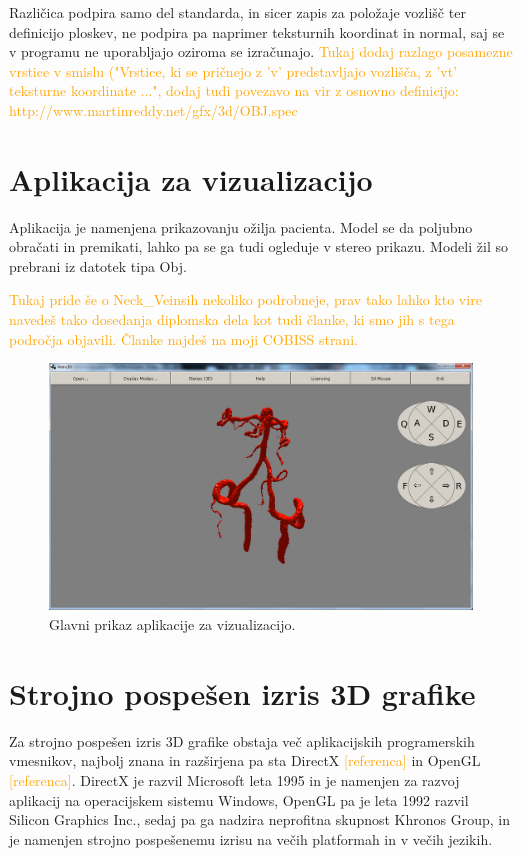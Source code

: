 \documentclass[a4paper, 12pt]{book}
\begin{document}
Različica podpira samo del standarda, in sicer zapis za položaje vozlišč ter definicijo ploskev, ne podpira pa naprimer teksturnih koordinat in normal, saj se v programu ne uporabljajo oziroma se izračunajo.
\textcolor{orange}{Tukaj dodaj razlago posamezne vrstice v smislu ("Vrstice, ki se pričnejo z 'v' predstavljajo vozlišča, z 'vt' teksturne koordinate ...", dodaj tudi povezavo na vir z osnovno definicijo: http://www.martinreddy.net/gfx/3d/OBJ.spec}

\section{Aplikacija za vizualizacijo}

Aplikacija je namenjena prikazovanju ožilja pacienta. Model se da poljubno obračati in premikati, lahko pa se ga tudi ogleduje v stereo prikazu. Modeli žil so prebrani iz datotek tipa Obj. 

\textcolor{orange}{Tukaj pride še o Neck\_Veinsih nekoliko podrobneje, prav tako lahko kto vire navedeš tako dosedanja diplomska dela kot tudi članke, ki smo jih s tega področja objavili. Članke najdeš na moji COBISS strani.}
\begin{figure}
\begin{center}
\includegraphics[width=14cm]{Aplikacija.png}
\end{center}
\caption{Glavni prikaz aplikacije za vizualizacijo.}
\label{aplikacija}
\end{figure}

\section{Strojno pospešen izris 3D grafike}
Za strojno pospešen izris 3D grafike obstaja več aplikacijskih programerskih vmesnikov, najbolj znana in razširjena pa sta DirectX \textcolor{orange}{[referenca]} in OpenGL  \textcolor{orange}{[referenca]}. DirectX je razvil Microsoft leta 1995 in je namenjen za razvoj aplikacij na operacijskem sistemu Windows, OpenGL pa je leta 1992 razvil Silicon Graphics Inc., sedaj pa ga nadzira neprofitna skupnost Khronos Group, in je namenjen strojno pospešenemu izrisu na večih platformah in v večih jezikih. 
\end{document}
